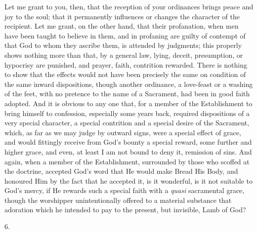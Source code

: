 Let me grant to you, then, that the reception of your ordinances
brings peace and joy to the soul; that it permanently influences or
changes the character of the recipient. Let me grant, on the other
hand, that their profanation, when men have been taught to believe in
them, and in profaning are guilty of contempt of that God to whom they
ascribe them, is attended by judgments; this properly shows nothing
more than that, by a general law, lying, deceit, presumption, or
hypocrisy are punished, and prayer, faith, contrition rewarded. There
is nothing to show that the effects would not have been precisely the
same on condition of the same inward dispositions, though another
ordinance, a love-feast or a washing of the feet, with no pretence to
the name of a Sacrament, had been in good faith adopted. And it is
obvious to any one that, for a member of the Establishment to bring
himself to confession, especially some years back, required
dispositions of a very special character, a special contrition and a
special desire of the Sacrament, which, as far as we may judge by
outward signs, were a special effect of grace, and would fittingly
receive from God's bounty a special reward, some further and higher
grace, and even, at least I am not bound to deny it, remission of
sins. And again, when a member of the Establishment, surrounded by
those who scoffed at the doctrine, accepted God's word that He would
make Bread His Body, and honoured Him by the fact that he accepted it,
is it wonderful, is it not suitable to God's mercy, if He rewards such
a special faith with a \emph{quasi} sacramental grace, though the
worshipper unintentionally offered to a material substance that
adoration which he intended to pay to the present, but invisible, Lamb
of God?

6.

